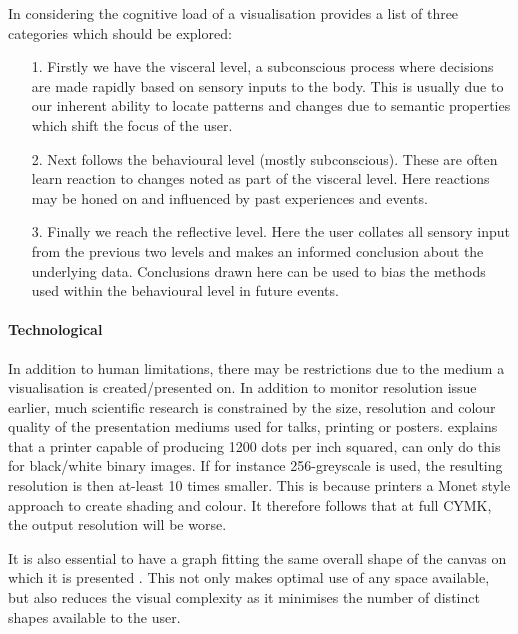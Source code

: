 In considering the cognitive load of a visualisation \citep{emotional} provides a list of three categories which should be explored:


\begin{itemize}
\item[1.] Firstly we have the visceral level, a subconscious process where decisions are made rapidly based on sensory inputs to the body. 
This is usually due to our inherent ability to locate patterns and changes due to semantic properties which shift the focus of the user.  

\item[2.] Next follows the behavioural level (mostly subconscious). These are often learn reaction to changes noted as part of the visceral level. Here reactions may be honed on and influenced by past experiences and events. 

\item[3.] Finally we reach the reflective level. Here the user collates all sensory input from the previous two levels and makes an informed conclusion about the underlying data. Conclusions drawn here can be used to bias the methods used within the behavioural level in future events. 
\end{itemize}

\paragraph{Technological}
In addition to human limitations, there may be restrictions due to the medium a visualisation is created/presented on. In addition to monitor resolution issue earlier, much scientific research is constrained by the size, resolution and colour quality of the presentation mediums used for talks, printing or posters. \citep{ware} explains that a printer capable of producing 1200 dots per inch squared, can only do this for black/white binary images. If for instance 256-greyscale is used, the resulting resolution is then at-least 10 times smaller. This is because printers a Monet style approach to create shading and colour. It therefore follows that at full CYMK, the output resolution will be worse. 

It is also essential to have a graph fitting the same overall shape of the canvas on which it is presented \citep{graphmetnew}. This not only makes optimal use of any space available, but also reduces the visual complexity as it minimises the number of distinct shapes available to the user. 




